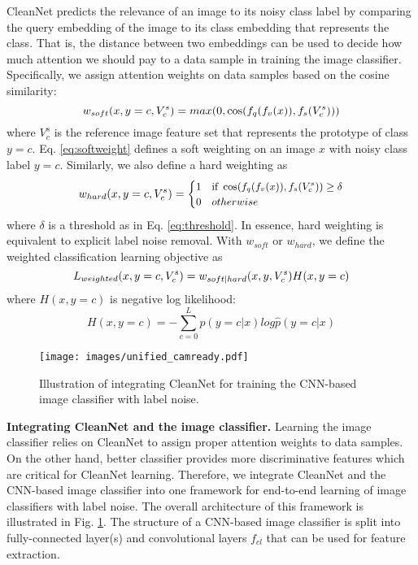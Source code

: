 \documentclass[10pt,twocolumn,letterpaper]{article}
\begin{document}
CleanNet predicts the relevance of an image to its noisy class label by comparing the query embedding of the image to its class embedding that represents the class. That is, the distance between two embeddings can be used to decide how much attention we should pay to a data sample in training the image classifier. Specifically, we assign attention weights on data samples based on the cosine similarity:
\begin{equation}
\small
w_{soft}(x, y=c, V_c^s) = max(0,\cos(f_q(f_v(x)), f_s(V_c^s)))
\label{eq:softweight}
\end{equation}
where $V_c^s$ is the reference image feature set that represents the prototype of class $y=c$. Eq. \eqref{eq:softweight} defines a soft weighting on an image $x$ with noisy class label $y=c$. Similarly, we also define a hard weighting as
\begin{equation}
w_{hard}(x, y=c, V_c^s) = 
\small
\begin{cases}
    1& \text{if } \cos(f_q(f_v(x)), f_s(V_c^s)) \geq \delta \\
    0& otherwise
\end{cases}
\label{eq:hardweight}
\end{equation}
where $\delta$ is a threshold as in Eq. \eqref{eq:threshold}. In essence, hard weighting is equivalent to explicit label noise removal. With $w_{soft}$ or $w_{hard}$, we define the weighted classification learning objective as 
\begin{equation}
\small
L_{weighted}(x, y=c, V_c^s) = w_{soft|hard}(x, y, V_c^s)H(x, y=c)
\label{eq:weighted_loss}
\end{equation}
where $H(x, y=c)$ is negative log likelihood:
\begin{equation}
H(x, y=c) = -\sum_{c=0}^Lp(y=c|x)log\hat{p}(y=c|x)
\end{equation}

\begin{figure}[t]
\begin{center}
\texttt{[image: images/unified\_camready.pdf]}
\end{center}
\vspace{-3mm}
\caption{Illustration of integrating CleanNet for training the CNN-based image classifier with label noise.}
\label{fig:unified}
\end{figure}


\noindent
\textbf{Integrating CleanNet and the image classifier.}
Learning the image classifier relies on CleanNet to assign proper attention weights to data samples. On the other hand, better classifier provides more discriminative features which are critical for CleanNet learning. Therefore, we integrate CleanNet and the CNN-based image classifier into one framework for end-to-end learning of image classifiers with label noise. The overall architecture of this framework is illustrated in Fig. \ref{fig:unified}. The structure of a CNN-based image classifier is split into fully-connected layer(s) and convolutional layers $f_{cl}$ that can be used for feature extraction.
\end{document}
